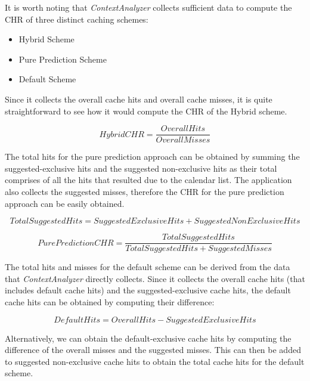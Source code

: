 \documentclass[12pt]{uthesis-v12}  %
\begin{document}
		It is worth noting that {\em ContextAnalyzer} collects sufficient data to compute the CHR of three distinct caching schemes:
		
		\begin{itemize}			
			\item Hybrid Scheme
			\item Pure Prediction Scheme
			\item Default Scheme
		\end{itemize}
		
		Since it collects the overall cache hits and overall cache misses, it is quite straightforward to see how it would compute the CHR of the Hybrid scheme.
		
		\begin{equation}
			Hybrid CHR = \frac{Overall Hits}{Overall Misses}
		\end{equation}
		
		The total hits for the pure prediction approach can be obtained by summing the suggested-exclusive hits and the suggested non-exclusive hits as their total comprises of all the hits that resulted due to the calendar list. The application also collects the suggested misses, therefore the CHR for the pure prediction approach can be easily obtained.
		
		\begin{equation}
			Total Suggested Hits = SuggestedExclusive  Hits + Suggested NonExclusive  Hits			
		\end{equation}
		
		\begin{equation}			
			Pure Prediction CHR = \frac{Total Suggested Hits}{Total Suggested Hits + Suggested Misses}
		\end{equation}
		
		The total hits and misses for the default scheme can be derived from the data that {\em ContextAnalyzer} directly collects. Since it collects the overall cache hits (that includes default cache hits) and the suggested-exclusive cache hits, the default cache hits can be obtained by computing their difference:
		
		\begin{equation}
			Default Hits = Overall Hits - Suggested Exclusive Hits
		\end{equation}
		
		Alternatively, we can obtain the default-exclusive cache hits by computing the difference of the overall misses and the suggested misses. This can then be added to suggested non-exclusive cache hits to obtain the total cache hits for the default scheme.
		
\end{document}
